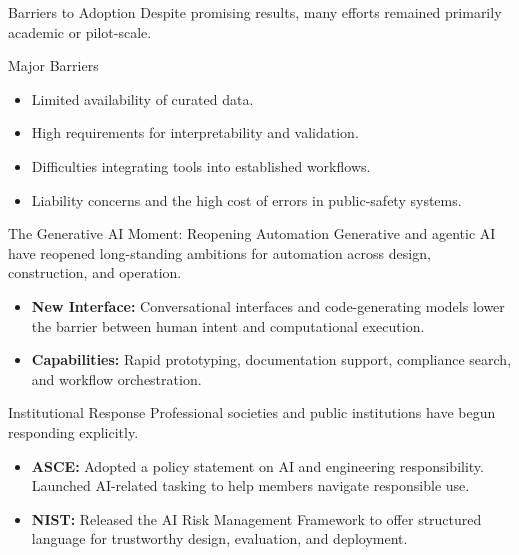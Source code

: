 \documentclass[german,10pt]{beamer}
\begin{document}
\begin{frame}{Barriers to Adoption}
    \justifying
    Despite promising results, many efforts remained primarily academic or pilot-scale.
    
    \begin{warningbox}{Major Barriers}
    \begin{itemize}
        \item Limited availability of curated data.
        \item High requirements for interpretability and validation.
        \item Difficulties integrating tools into established workflows.
        \item Liability concerns and the high cost of errors in public-safety systems.
    \end{itemize}
    \end{warningbox}
\end{frame}

\begin{frame}{The Generative AI Moment: Reopening Automation}
    \justifying
    Generative and agentic AI have reopened long-standing ambitions for automation across design, construction, and operation.
    \begin{itemize}
        \item \textbf{New Interface:} Conversational interfaces and code-generating models lower the barrier between human intent and computational execution.
        \item \textbf{Capabilities:} Rapid prototyping, documentation support, compliance search, and workflow orchestration.
    \end{itemize}
\end{frame}

\begin{frame}{Institutional Response}
    \justifying
    Professional societies and public institutions have begun responding explicitly.
    \begin{itemize}
        \item \textbf{ASCE:} Adopted a policy statement on AI and engineering responsibility. Launched AI-related tasking to help members navigate responsible use.
        \item \textbf{NIST:} Released the AI Risk Management Framework to offer structured language for trustworthy design, evaluation, and deployment.
    \end{itemize}
\end{frame}
\end{document}
